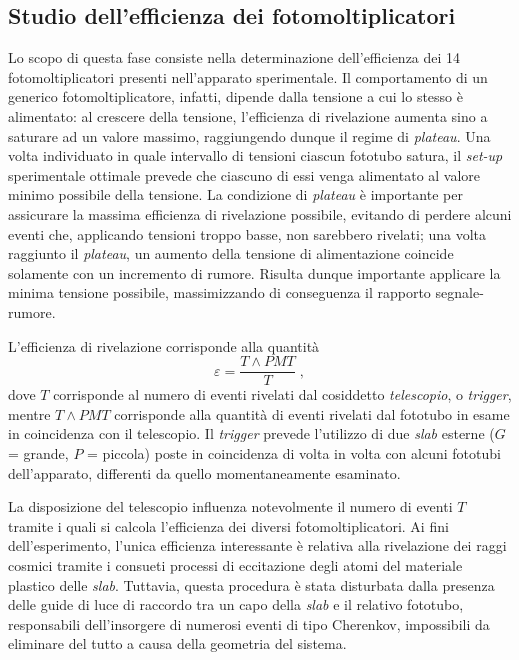 \documentclass[11pt, oneside, a4paper]{article}   	%
\begin{document}
\subsection{Studio dell'efficienza dei fotomoltiplicatori}
Lo scopo di questa fase consiste nella determinazione dell'efficienza dei 14 fotomoltiplicatori presenti nell'apparato sperimentale. Il comportamento di un generico fotomoltiplicatore, infatti, dipende dalla tensione a cui lo stesso è alimentato: al crescere della tensione, l'efficienza di rivelazione aumenta sino a saturare ad un valore massimo, raggiungendo dunque il regime di \textit{plateau}. Una volta individuato in quale intervallo di tensioni ciascun fototubo satura, il \emph{set-up} sperimentale ottimale prevede che ciascuno di essi venga alimentato al valore minimo possibile della tensione. La condizione di \textit{plateau} è importante per assicurare la massima efficienza di rivelazione possibile, evitando di perdere alcuni eventi che, applicando tensioni troppo basse, non sarebbero rivelati; una volta raggiunto il \textit{plateau}, un aumento della tensione di alimentazione coincide solamente con un incremento di rumore. Risulta dunque importante applicare la minima tensione possibile, massimizzando di conseguenza il rapporto segnale-rumore. 

L'efficienza di rivelazione corrisponde alla quantità
\[\varepsilon = \frac{T\wedge PMT}{T}\;,\]
dove $T$ corrisponde al numero di eventi rivelati dal cosiddetto \textit{telescopio}, o \textit{trigger}, mentre $T\wedge PMT$ corrisponde alla quantità di eventi rivelati dal fototubo in esame in coincidenza con il telescopio. Il \emph{trigger} prevede l'utilizzo di due \emph{slab} esterne \linebreak ($G$ = grande, $P$ = piccola) poste in coincidenza di volta in volta con alcuni fototubi dell'apparato, differenti da quello momentaneamente esaminato. 

La disposizione del telescopio influenza notevolmente il numero di eventi $T$ tramite i quali si calcola l'efficienza dei diversi fotomoltiplicatori. Ai fini dell'esperimento, l'unica efficienza interessante è relativa alla rivelazione dei raggi cosmici tramite i consueti processi di eccitazione degli atomi del materiale plastico delle \emph{slab}. Tuttavia, questa procedura è stata disturbata dalla presenza delle guide di luce di raccordo tra un capo della \emph{slab} e il relativo fototubo, responsabili dell'insorgere di numerosi eventi di tipo Cherenkov, impossibili da eliminare del tutto a causa della geometria del sistema.
\end{document}
